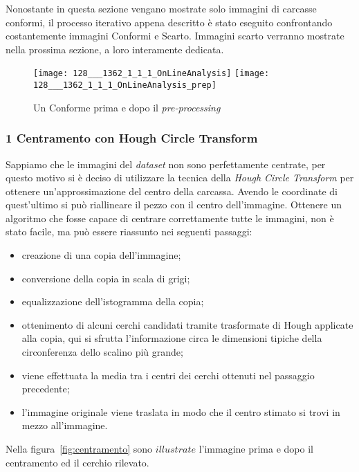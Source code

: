 Nonostante in questa sezione vengano mostrate solo immagini di carcasse conformi, il processo iterativo appena descritto è stato eseguito confrontando costantemente immagini Conformi e Scarto.
Immagini scarto verranno mostrate nella prossima sezione, a loro interamente dedicata.

\begin{figure}[ht] %
  \begin{center}
    \texttt{[image: 128\_\_\_1362\_1\_1\_1\_OnLineAnalysis]}
    \texttt{[image: 128\_\_\_1362\_1\_1\_1\_OnLineAnalysis\_prep]}
    \caption{Un Conforme prima e dopo il \textit{pre-processing}}
    \label{fig:prima_dopo_prep}
  \end{center}
\end{figure}

\subsubsection{1 Centramento con Hough Circle Transform}
Sappiamo che le immagini del \textit{dataset} non sono perfettamente centrate, per questo motivo si è deciso di utilizzare la tecnica della \textit{Hough Circle Transform} per ottenere un'approssimazione del centro della carcassa.
Avendo le coordinate di quest'ultimo si può riallineare il pezzo con il centro dell'immagine.
Ottenere un algoritmo che fosse capace di centrare correttamente tutte le immagini, non è stato facile, ma può essere riassunto nei seguenti passaggi:
\begin{itemize}
  \item creazione di una copia dell'immagine;
  \item conversione della copia in scala di grigi;
  \item equalizzazione dell'istogramma della copia;
  \item ottenimento di alcuni cerchi candidati tramite trasformate di Hough applicate alla copia, qui si sfrutta l'informazione circa le dimensioni tipiche della circonferenza dello scalino più grande;
  \item viene effettuata la media tra i centri dei cerchi ottenuti nel passaggio precedente;
  \item l'immagine originale viene traslata in modo che il centro stimato si trovi in mezzo all'immagine.
\end{itemize}

Nella figura~\ref{fig:centramento} sono $illustrate$ l'immagine prima e dopo il centramento ed il cerchio rilevato.

